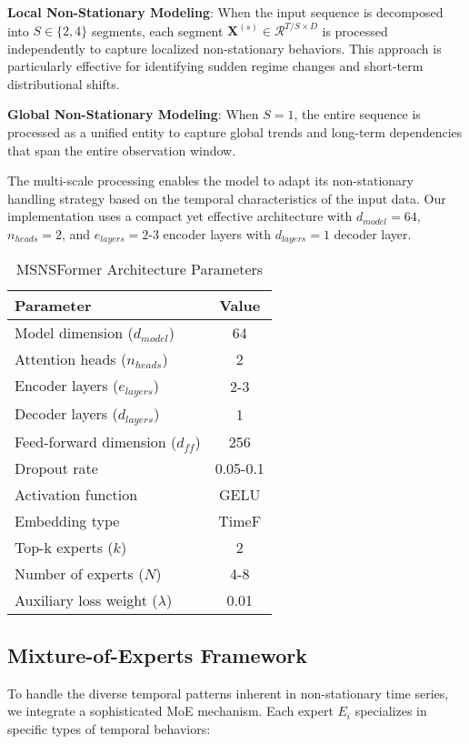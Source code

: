 \documentclass{article}
\begin{document}
\textbf{Local Non-Stationary Modeling}: When the input sequence is decomposed into $S \in \{2, 4\}$ segments, each segment $\mathbf{X}^{(s)} \in \mathcal{R}^{T/S \times D}$ is processed independently to capture localized non-stationary behaviors. This approach is particularly effective for identifying sudden regime changes and short-term distributional shifts.

\textbf{Global Non-Stationary Modeling}: When $S = 1$, the entire sequence is processed as a unified entity to capture global trends and long-term dependencies that span the entire observation window.

The multi-scale processing enables the model to adapt its non-stationary handling strategy based on the temporal characteristics of the input data. Our implementation uses a compact yet effective architecture with $d_{model} = 64$, $n_{heads} = 2$, and $e_{layers} = 2\text{-}3$ encoder layers with $d_{layers} = 1$ decoder layer.

\begin{table}[h]
\centering
\caption{MSNSFormer Architecture Parameters}
\label{tab:arch_params}
\begin{tabular}{@{}lc@{}}
\toprule
\textbf{Parameter} & \textbf{Value} \\
\midrule
Model dimension ($d_{model}$) & 64 \\
Attention heads ($n_{heads}$) & 2 \\
Encoder layers ($e_{layers}$) & 2-3 \\
Decoder layers ($d_{layers}$) & 1 \\
Feed-forward dimension ($d_{ff}$) & 256 \\
Dropout rate & 0.05-0.1 \\
Activation function & GELU \\
Embedding type & TimeF \\
Top-k experts ($k$) & 2 \\
Number of experts ($N$) & 4-8 \\
Auxiliary loss weight ($\lambda$) & 0.01 \\
\bottomrule
\end{tabular}
\end{table}

\subsection{Mixture-of-Experts Framework}
To handle the diverse temporal patterns inherent in non-stationary time series, we integrate a sophisticated MoE mechanism. Each expert $E_i$ specializes in specific types of temporal behaviors:
\end{document}
